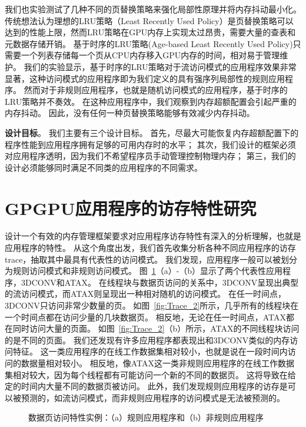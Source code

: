 我们也实验测试了几种不同的页替换策略来强化局部性原理并将内存抖动最小化。
传统想法认为理想的LRU策略（Least Recently Used Policy）是页替换策略可以达到的性能上限，然而LRU策略在GPU内存上实现太过昂贵，需要大量的查表和元数据存储开销。
基于时序的LRU策略(Age-based Least Recently Used Policy)只需要一个列表存储每一个页从CPU内存移入GPU内存的时间，相对易于管理维护。
我们的实验显示，基于时序的LRU策略对于流访问模式的应用程序效果非常显著，这种访问模式的应用程序即为我们定义的具有强序列局部性的规则应用程序。
然而对于非规则应用程序，也就是随机访问模式的应用程序，基于时序的LRU策略并不奏效。
在这种应用程序中，我们观察到内存超额配置会引起严重的内存抖动。
因此，没有任何一种页替换策略能够有效减少内存抖动。

\textbf{设计目标}。
我们主要有三个设计目标。
首先，尽最大可能恢复内存超额配置下的程序性能到应用程序拥有足够的可用内存时的水平；
其次，我们设计的框架必须对应用程序透明，因为我们不希望程序员手动管理控制物理内存；
第三，我们的设计必须能够同时满足不同类的应用程序的不同需求。

\section{GPGPU应用程序的访存特性研究}

设计一个有效的内存管理框架要求对应用程序访存特性有深入的分析理解，也就是应用程序的特性。
从这个角度出发，我们首先收集分析各种不同应用程序的访存trace，抽取其中最具有代表性的访问模式。
我们发现，应用程序一般可以被划分为规则访问模式和非规则访问模式。
图~\ref{fig:Trace_1}（a）-（b）显示了两个代表性应用程序，3DCONV和ATAX。
在线程块与数据页访问的关系中，3DCONV呈现出典型的流访问模式，而ATAX则呈现出一种相对随机的访问模式。
在任一时间点，3DCONV只访问非常少数量的页。
如图~\ref{fig:Trace_2}所示，几乎所有的线程块在一个时间点都在访问少量的几块数据页。
相反地，无论在任一时间点，ATAX都在同时访问大量的页面。
如图~\ref{fig:Trace_2}（b）所示，ATAX的不同线程块访问的是不同的页面。
我们还发现有许多应用程序都表现出和3DCONV类似的内存访问特征。
这一类应用程序的在线工作数据集相对较小，也就是说在一段时间内访问的数据量相对较小。
相反地，像ATAX这一类非规则应用程序的在线工作数据集相对较大，因为每个线程都有可能访问一个新的不同的数据页。
这将导致在给定的时间内大量不同的数据页被访问。
此外，我们发现规则应用程序的访存是可以被预测的，如流访问模式，而非规则应用程序的访问模式是无法被预测的。



\begin{figure}[htb]
\centering
{} \qquad
{}  
\caption{数据页访问特性实例：（a）规则应用程序和（b）非规则应用程序}
\label{fig:Trace_1}
\end{figure}


